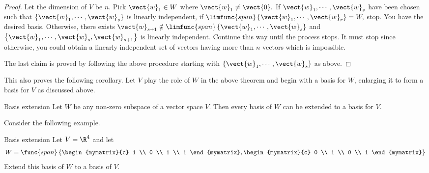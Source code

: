 \begin{proof}
Let the dimension of $V$ be $n$. Pick $\vect{w}_{1}\in W$
where $\vect{w}_{1}\neq \vect{0}.$ If $\vect{w}_{1},\cdots ,\vect{w}_{s}$ have
been chosen such that $\left\{ \vect{w}_{1},\cdots ,\vect{w}_{s}\right\} $ is
linearly independent, if $\limfunc{span}\left\{ \vect{w}_{1},\cdots ,\vect{w}
_{r}\right\} =W,$ stop. You have the desired basis. Otherwise, there exists $
\vect{w}_{s+1}\notin \limfunc{span}\left\{ \vect{w}_{1},\cdots ,\vect{w}
_{s}\right\} $ and $\left\{ \vect{w}_{1},\cdots ,
\vect{w}_{s},\vect{w}_{s+1}\right\} $ is linearly independent. Continue this
way until the process stops. It must stop since otherwise, you could obtain a
linearly independent set of vectors having more than $n$ vectors which is
impossible.

The last claim is proved by following the above procedure starting with $
\left\{ \vect{w}_{1},\cdots ,\vect{w}_{s}\right\} $ as above. 
\end{proof}

This also proves the following corollary. Let $V$ play the role of $
W$ in the above theorem and begin with a basis for $W$, enlarging it to form
a basis for $V$ as discussed above.

\begin{corollary}{Basis extension}{}
Let $W$ be any non-zero subspace of a vector space $V$.
Then every basis of $W$ can be extended to a basis for $V$.
\end{corollary}

Consider the following example.

\begin{example}{Basis extension}{}
Let $V=\R^{4}$ and let 
\begin{equation*}
W=\func{span}\left\{ \begin{mymatrix}{c}
1 \\ 
0 \\ 
1 \\ 
1
\end{mymatrix} ,\begin{mymatrix}{c}
0 \\ 
1 \\ 
0 \\ 
1
\end{mymatrix} \right\}
\end{equation*}
Extend this basis of $W$ to a basis of $V$.
\end{example}

